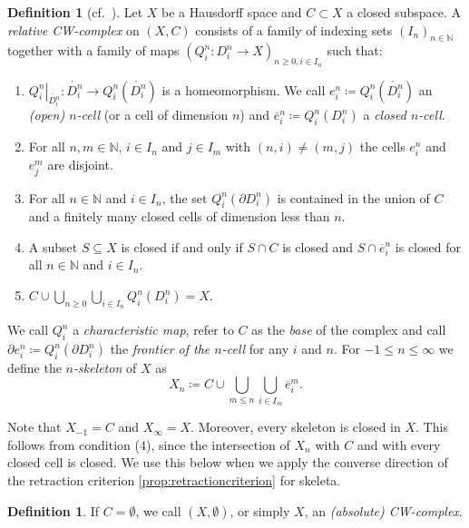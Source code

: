 \documentclass[11pt, a4paper, english]{article}
\newcommand{\interior}[1]{\mathring{#1}}
\renewcommand{\boundary}{\partial}
\newcommand{\restrict}[2]{\left.#1\right|_{#2}}
\newcommand{\openCell}[2]{e^{#1}_{#2}}
\newcommand{\closedCell}[2]{\overline{e}^{#1}_{#2}}
\newcommand{\cellFrontier}[2]{\partial e^{#1}_{#2}}
\theoremstyle{plain}
\theoremstyle{definition}
\newtheorem{definition}[theorem]{Definition}
\theoremstyle{remark}
\numberwithin{equation}{section}
\numberwithin{theorem}{section}
\begin{document}
\begin{definition} [cf.\ {\cite[Definition 1.1.2.]{SCH01}}] \label{def:CWComplex}
Let $X$ be a Hausdorff space and $C \subset X$ a closed subspace. A \emph{relative CW-complex} on $(X,C)$ consists of a family of indexing sets $(I_n)_{n \in \mathbb{N}}$ together with a family of maps $(Q_i^n\colon D_i^n\to X)_{n \ge 0, i \in I_n}$ such that:
    \begin{enumerate}
        \item $\restrict{Q_i^n}{\interior{D_i^n}}\colon \interior{D_i^n} \to Q_i^n(\interior{D_i^n})$ is a homeomorphism. We call $\openCell{n}{i} \coloneq Q_i^n(\interior{D_i^n})$ an \emph{(open) $n$-cell} (or a cell of dimension $n$) and $\closedCell{n}{i} \coloneq Q_i^n(D_i^n)$ a \emph{closed $n$-cell}.
        \item For all $n, m \in \mathbb{N}$, $i \in I_n$ and $j \in I_m$ with $(n, i) \ne (m, j)$ the cells $\openCell{n}{i}$ and $\openCell{m}{j}$ are disjoint.
        \item For all $n \in \mathbb{N}$ and $i \in I_n$, the set $Q_i^n(\boundary D_i^n)$ is contained in the union of $C$ and a finitely many closed cells of dimension less than $n$.
        \item A subset $S \subseteq X$ is closed if and only if $S \cap C$ is closed and $S \cap \closedCell{n}{i}$ is closed for all $n \in \mathbb{N}$ and $i \in I_n$.
        \item $C \cup \bigcup_{n \ge 0}\bigcup_{i \in I_n} Q_i^n(D_i^n) = X$.
    \end{enumerate}
    We call $Q_i^n$ a \emph{characteristic map}, refer to $C$ as the \emph{base} of the complex and call $\cellFrontier{n}{i} \coloneq Q_i^n(\boundary D_i^n)$ the \emph{frontier of the $n$-cell} for any $i$ and $n$. For $-1 \le n \le \infty$ we define the \emph{$n$-skeleton} of $X$ as
    \[
        X_n \coloneqq C \cup \bigcup_{m \le n} \bigcup_{i \in I_m}
        \closedCell{m}{i} .
    \]
\end{definition}

Note that $X_{-1} = C$ and $X_\infty = X$. Moreover, every skeleton is closed in $X$. This follows from condition (4), since the intersection of $X_n$ with $C$ and with every closed cell is closed. We use this below when we apply the converse direction of the retraction criterion \cref{prop:retractioncriterion} for skeleta.

\begin{definition}
    If $C = \emptyset$, we call $(X,\emptyset)$, or simply $X$, an \emph{(absolute) CW-complex}.
\end{definition}
\end{document}
